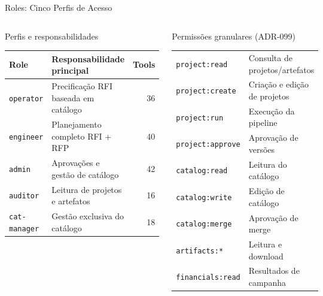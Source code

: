 \documentclass[aspectratio=169,10pt]{beamer}
\newcommand{\role}[1]{\texttt{\small #1}}
\begin{document}
\begin{frame}{Roles: Cinco Perfis de Acesso}
  \begin{columns}[T]
    \begin{block}{Perfis e responsabilidades}
      \renewcommand{\arraystretch}{1.15}
      \begin{tabularx}{\linewidth}{@{}l X r@{}}
        \toprule
        \textbf{Role} & \textbf{Responsabilidade principal} & \textbf{Tools} \\
        \midrule
        \role{operator}     & Precificação RFI baseada em catálogo & 36 \\
        \role{engineer}     & Planejamento completo RFI + RFP      & 40 \\
        \role{admin}        & Aprovações e gestão de catálogo       & 42 \\
        \role{auditor}      & Leitura de projetos e artefatos       & 16 \\
        \role{cat-manager}  & Gestão exclusiva do catálogo          & 18 \\
        \bottomrule
      \end{tabularx}
    \end{block}
    \vspace{4pt}
    \begin{block}{Permissões granulares (ADR-099)}
      \begin{tabular}{ll}\scriptsize
        \texttt{project:read}    & Consulta de projetos/artefatos \\
        \texttt{project:create}  & Criação e edição de projetos \\
        \texttt{project:run}     & Execução da pipeline \\
        \texttt{project:approve} & Aprovação de versões \\
        \texttt{catalog:read}    & Leitura do catálogo \\
        \texttt{catalog:write}   & Edição de catálogo \\
        \texttt{catalog:merge}   & Aprovação de merge \\
        \texttt{artifacts:*}     & Leitura e download \\
        \texttt{financials:read} & Resultados de campanha \\
      \end{tabular}
    \end{block}


\end{columns}
\end{frame}
\end{document}
